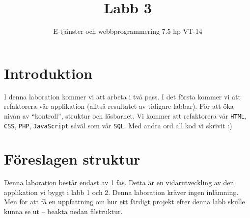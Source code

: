 \documentclass[12pt]{article}
\date{}
\title{ Labb 3 }
\author{ E-tjänster och webbprogrammering 7.5 hp VT-14 }
\begin{document}
\maketitle
\vspace{-2em}



\section{Introduktion}
I denna laboration kommer vi att arbeta i två pass. I det första kommer vi att refaktorera vår applikation (alltså resultatet av tidigare labbar). För att öka nivån av ``kontroll'', struktur och läsbarhet. Vi kommer att refaktorera vår \texttt{HTML}, \texttt{CSS}, \texttt{PHP}, \texttt{JavaScript} såväl som vår \texttt{SQL}. Med andra ord all kod vi skrivit :)


\pagebreak
\section{Föreslagen struktur}
Denna laboration består endast av 1 fas. Detta är en vidarutveckling av den applikation vi byggt i labb 1 och 2. Denna laboration kräver ingen inlämning. Men för att få en uppfattning om hur ett färdigt projekt efter denna labb skulle kunna se ut -- beakta nedan filstruktur.
\end{document}
